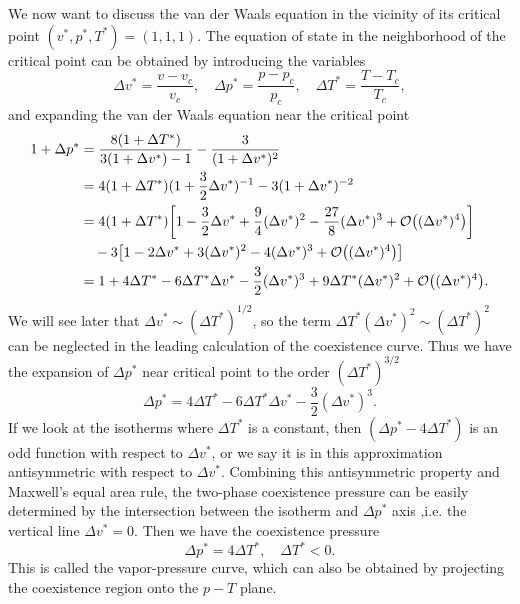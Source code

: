 \documentclass[10pt]{article}
\begin{document}
	We now want to discuss the van der Waals equation in the vicinity of its critical point $(v^*, p^*, T^*) = (1, 1, 1)$. The equation of state in the neighborhood of the critical point can be obtained by introducing the variables
	\begin{equation}
		\Delta v^* = \frac{v - v_c}{v_c}, \quad \Delta p^* = \frac{p - p_c}{p_c}, \quad \Delta T^* = \frac{T - T_c}{T_c},
	\end{equation}
	and expanding the van der Waals equation near the critical point
	\begin{align*}
		1 + \Delta p^* &= \frac{8(1+\Delta T^*)}{3(1+\Delta v^*) - 1} - \frac{3}{(1+\Delta v^*)^2} \\
		&= 4(1+\Delta T^*)(1 + \frac{3}{2} \Delta v^*)^{-1} - 3(1+\Delta v^*)^{-2} \\
		&= 4(1+\Delta T^*)\qty[1 - \frac{3}{2} \Delta v^* + \frac{9}{4} (\Delta v^*)^2 - \frac{27}{8} (\Delta v^*)^3 + \order{(\Delta v^*)^4}] \\
		&\quad -3\qty[1 - 2\Delta v^* + 3(\Delta v^*)^2 - 4(\Delta v^*)^3 + \order{(\Delta v^*)^4}] \\
		&= 1 + 4\Delta T^* - 6\Delta T^*\Delta v^* - \frac{3}{2}(\Delta v^*)^3 + 9\Delta T^*(\Delta v^*)^2 + \order{(\Delta v^*)^4}.
	\end{align*}
	We will see later that $\Delta v^* \sim (\Delta T^*)^{1/2}$, so the term $\Delta T^*(\Delta v^*)^2 \sim (\Delta T^*)^{2}$ can be neglected in the leading calculation of the coexistence curve. Thus we have the expansion of $\Delta p^*$ near critical point to the order $(\Delta T^*)^{3/2}$
	\begin{equation}
		\Delta p^* = 4 \Delta T^* - 6 \Delta T^* \Delta v^* - \frac{3}{2} (\Delta v^*)^3.
	\end{equation}
	If we look at the isotherms where $\Delta T^*$ is a constant, then $(\Delta p^* - 4 \Delta T^*)$ is an odd function with respect to $\Delta v^*$, or we say it is in this approximation antisymmetric with respect to $\Delta v^*$. Combining this antisymmetric property and Maxwell's equal area rule, the two-phase coexistence pressure can be easily determined by the intersection between the isotherm and $\Delta p^*$ axis ,i.e. the vertical line $\Delta v^* = 0$. Then we have the coexistence pressure
	\begin{equation}
		\Delta p^* = 4 \Delta T^*, \quad \Delta T^* < 0.
	\end{equation}
	This is called the vapor-pressure curve, which can also be obtained by projecting the coexistence region onto the $p-T$ plane.
\end{document}
